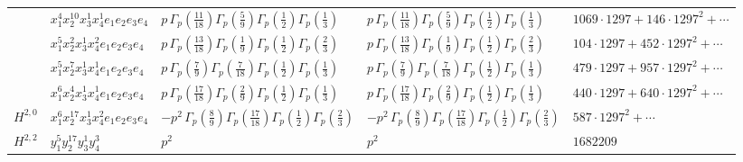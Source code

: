 \documentclass[11pt]{article}
\begin{document}
\begin{table}[ht]
{\begin{tabular}{@{}lllll@{}}
 & $x_{1}^{4} x_{2}^{10} x_{3}^{1} x_{4}^{1}  e_{1} e_{2} e_{3} e_{4}$ & $p \, \Gamma_p \left( \frac{11}{18} \right) \Gamma_p \left( \frac{5}{9} \right) \Gamma_p \left( \frac{1}{2} \right) \Gamma_p \left( \frac{1}{3} \right)$ & $p \, \Gamma_p \left( \frac{11}{18} \right) \Gamma_p \left( \frac{5}{9} \right) \Gamma_p \left( \frac{1}{2} \right) \Gamma_p \left( \frac{1}{3} \right)$ & $1069{\cdot}1297{+}146{\cdot}1297^{2}{+}\cdots$ \\
 & $x_{1}^{5} x_{2}^{2} x_{3}^{1} x_{4}^{2}  e_{1} e_{2} e_{3} e_{4}$ & $p \, \Gamma_p \left( \frac{13}{18} \right) \Gamma_p \left( \frac{1}{9} \right) \Gamma_p \left( \frac{1}{2} \right) \Gamma_p \left( \frac{2}{3} \right)$ & $p \, \Gamma_p \left( \frac{13}{18} \right) \Gamma_p \left( \frac{1}{9} \right) \Gamma_p \left( \frac{1}{2} \right) \Gamma_p \left( \frac{2}{3} \right)$ & $104{\cdot}1297{+}452{\cdot}1297^{2}{+}\cdots$ \\
 & $x_{1}^{5} x_{2}^{7} x_{3}^{1} x_{4}^{1}  e_{1} e_{2} e_{3} e_{4}$ & $p \, \Gamma_p \left( \frac{7}{9} \right) \Gamma_p \left( \frac{7}{18} \right) \Gamma_p \left( \frac{1}{2} \right) \Gamma_p \left( \frac{1}{3} \right)$ & $p \, \Gamma_p \left( \frac{7}{9} \right) \Gamma_p \left( \frac{7}{18} \right) \Gamma_p \left( \frac{1}{2} \right) \Gamma_p \left( \frac{1}{3} \right)$ & $479{\cdot}1297{+}957{\cdot}1297^{2}{+}\cdots$ \\
 & $x_{1}^{6} x_{2}^{4} x_{3}^{1} x_{4}^{1}  e_{1} e_{2} e_{3} e_{4}$ & $p \, \Gamma_p \left( \frac{17}{18} \right) \Gamma_p \left( \frac{2}{9} \right) \Gamma_p \left( \frac{1}{2} \right) \Gamma_p \left( \frac{1}{3} \right)$ & $p \, \Gamma_p \left( \frac{17}{18} \right) \Gamma_p \left( \frac{2}{9} \right) \Gamma_p \left( \frac{1}{2} \right) \Gamma_p \left( \frac{1}{3} \right)$ & $440{\cdot}1297{+}640{\cdot}1297^{2}{+}\cdots$ \\
\midrule
$H^{2,0}$ & $x_{1}^{6} x_{2}^{17} x_{3}^{1} x_{4}^{2}  e_{1} e_{2} e_{3} e_{4}$ & $- p^{2} \, \Gamma_p \left( \frac{8}{9} \right) \Gamma_p \left( \frac{17}{18} \right) \Gamma_p \left( \frac{1}{2} \right) \Gamma_p \left( \frac{2}{3} \right)$ & $- p^{2} \, \Gamma_p \left( \frac{8}{9} \right) \Gamma_p \left( \frac{17}{18} \right) \Gamma_p \left( \frac{1}{2} \right) \Gamma_p \left( \frac{2}{3} \right)$ & $587{\cdot}1297^{2}{+}\cdots$ \\
\midrule
$H^{2,2}$ & $y_{1}^{5} y_{2}^{17} y_{3}^{1} y_{4}^{3}$ & $p^{2} \,$ & $p^{2} \,$ & $1682209$ \\
\bottomrule
\end{tabular}
}
\renewcommand{\arraystretch}{1.0}
\end{table}
\end{document}
